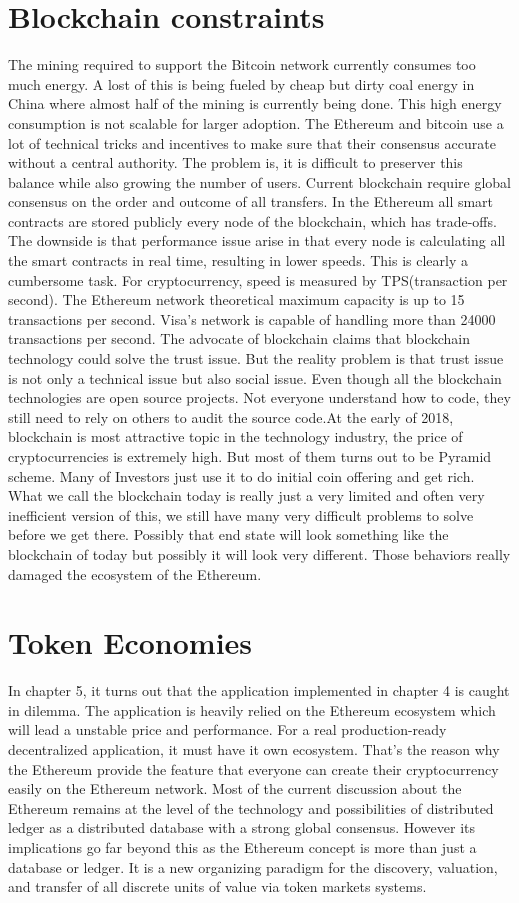 \documentclass[openany,12pt]{ecsthesis}      %
\begin{document}
\section{Blockchain constraints}
The mining required to support the Bitcoin network currently consumes too much energy. 
A lost of this is being fueled by cheap but dirty coal energy in China where almost half of the mining is currently being done.
This high energy consumption is not scalable for larger adoption. 
The Ethereum and bitcoin use a lot of technical tricks and incentives 
to make sure that their consensus accurate without a central authority.
The problem is, it is difficult to preserver this balance while also growing the number of users. Current blockchain require global consensus on the order and outcome of all transfers.
In the Ethereum all smart contracts are stored publicly every node of the blockchain, which has trade-offs. 
The downside is that performance issue arise in that every node is calculating all the smart contracts in real time,
resulting in lower speeds. This is clearly a cumbersome task. For cryptocurrency, speed is measured by TPS(transaction per second). 
The Ethereum network theoretical maximum capacity is up to 15 transactions per second. Visa's network is capable of handling more than 24000 transactions per second.
The advocate of blockchain claims that blockchain technology could solve the trust issue. 
But the reality problem is that trust issue is not only a technical issue but also social issue.
Even though all the blockchain technologies are open source projects. Not everyone understand how to code, 
they still need to rely on others to audit the source code.At the early of 2018, blockchain is most attractive topic in the technology industry, 
the price of cryptocurrencies is extremely high. But most of them turns out to be Pyramid scheme. 
Many of Investors just use it to do initial coin offering and get rich. 
What we call the blockchain today is really just a very limited and often very inefficient version of
this, we still have many very difficult problems to solve before we get there. Possibly that end state
will look something like the blockchain of today but possibly it will look very different. 
Those behaviors really damaged the ecosystem of the Ethereum.
\section{Token Economies}
In chapter 5, it turns out that the application implemented in chapter 4 is caught in dilemma. 
The application is heavily relied on the Ethereum ecosystem which will lead a unstable price and performance. For a real production-ready decentralized application, 
it must have it own ecosystem. 
That's the reason why the Ethereum provide the feature that everyone can create their cryptocurrency easily on the Ethereum network.
Most of the current discussion about the Ethereum remains at the level of the technology and possibilities of distributed ledger as a distributed database with a strong global consensus. 
However its implications go far beyond this as the Ethereum concept is more than just a database or ledger. 
It is a new organizing paradigm for the discovery, valuation, and transfer of all discrete units of value via token markets systems.
\end{document}
